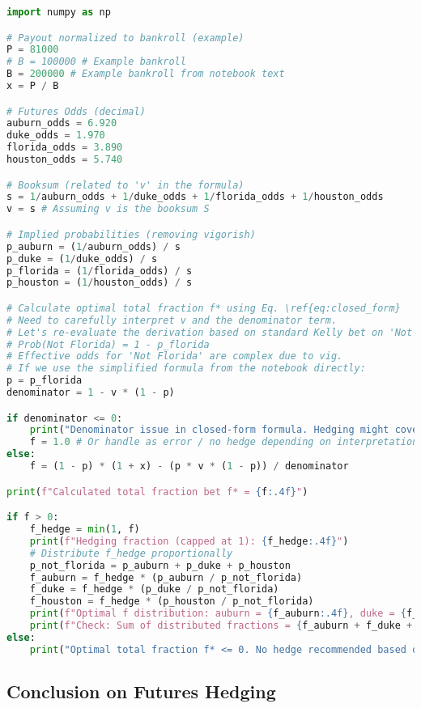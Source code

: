 \documentclass{article}
\begin{document}
\begin{lstlisting}[language=Python, caption={Python code for calculating the closed-form total hedge fraction and distribution.}]
import numpy as np

# Payout normalized to bankroll (example)
P = 81000
# B = 100000 # Example bankroll
B = 200000 # Example bankroll from notebook text
x = P / B 

# Futures Odds (decimal)
auburn_odds = 6.920
duke_odds = 1.970
florida_odds = 3.890
houston_odds = 5.740

# Booksum (related to 'v' in the formula)
s = 1/auburn_odds + 1/duke_odds + 1/florida_odds + 1/houston_odds
v = s # Assuming v is the booksum S

# Implied probabilities (removing vigorish)
p_auburn = (1/auburn_odds) / s
p_duke = (1/duke_odds) / s
p_florida = (1/florida_odds) / s
p_houston = (1/houston_odds) / s

# Calculate optimal total fraction f* using Eq. \ref{eq:closed_form}
# Need to carefully interpret v and the denominator term.
# Let's re-evaluate the derivation based on standard Kelly bet on 'Not Florida'.
# Prob(Not Florida) = 1 - p_florida
# Effective odds for 'Not Florida' are complex due to vig.
# If we use the simplified formula from the notebook directly:
p = p_florida
denominator = 1 - v * (1 - p)

if denominator <= 0:
    print("Denominator issue in closed-form formula. Hedging might cover entire bankroll or formula assumption break.")
    f = 1.0 # Or handle as error / no hedge depending on interpretation
else:
    f = (1 - p) * (1 + x) - (p * v * (1 - p)) / denominator

print(f"Calculated total fraction bet f* = {f:.4f}")

if f > 0:
    f_hedge = min(1, f)
    print(f"Hedging fraction (capped at 1): {f_hedge:.4f}")
    # Distribute f_hedge proportionally
    p_not_florida = p_auburn + p_duke + p_houston
    f_auburn = f_hedge * (p_auburn / p_not_florida)
    f_duke = f_hedge * (p_duke / p_not_florida)
    f_houston = f_hedge * (p_houston / p_not_florida)
    print(f"Optimal f distribution: auburn = {f_auburn:.4f}, duke = {f_duke:.4f}, houston = {f_houston:.4f}")
    print(f"Check: Sum of distributed fractions = {f_auburn + f_duke + f_houston:.4f}")
else:
    print("Optimal total fraction f* <= 0. No hedge recommended based on this formula.")

\end{lstlisting}

\subsection{Conclusion on Futures Hedging}
\end{document}
